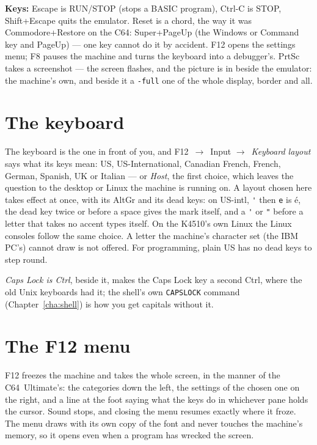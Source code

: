 \begin{aside}
\textbf{Keys:} Escape is RUN/STOP (stops a BASIC program), Ctrl-C is
STOP, Shift+Escape quits the emulator. Reset is a chord, the way it was
Commodore+Restore on the C64: Super+PageUp (the Windows or Command key
and PageUp) --- one key cannot do it by accident. F12 opens the settings
menu; F8 pauses the machine and turns the keyboard into a debugger's.
PrtSc takes a screenshot --- the screen flashes, and the picture is in
 beside the emulator: the machine's own, and beside it a
\texttt{-full} one of the whole display, border and all.
\end{aside}

\section{The keyboard}
The keyboard is the one in front of you, and F12~$\rightarrow$~Input
$\rightarrow$~\emph{Keyboard layout} says what its keys mean: US,
US-International, Canadian French, French, German, Spanish, UK or
Italian --- or \emph{Host}, the first choice, which leaves the question
to the desktop or Linux the machine is running on. A layout chosen here
takes effect at once, with its AltGr and its dead keys: on US-intl,
\verb|'| then \verb|e| is \'e, the dead key twice or before a space
gives the mark itself, and a \verb|'| or \verb|"| before a letter that
takes no accent types itself. On the K4510's own Linux the Linux consoles
follow the same choice. A letter the machine's character set (the IBM
PC's) cannot draw is not offered. For programming, plain US has no dead
keys to step round.

\emph{Caps Lock is Ctrl}, beside it, makes the Caps Lock key a second
Ctrl, where the old Unix keyboards had it; the shell's own
\verb|CAPSLOCK| command (Chapter~\ref{cha:shell}) is how you get capitals
without it.

\section{The F12 menu}
F12 freezes the machine and
takes the whole screen, in the manner of the C64~Ultimate's: the
categories down the left, the settings of the chosen one on the right,
and a line at the foot saying what the keys do in whichever pane holds
the cursor. Sound stops, and closing the menu resumes exactly where it
froze. The menu draws with its own copy of the font and never touches the machine's
memory, so it opens even when a program has wrecked the screen.

